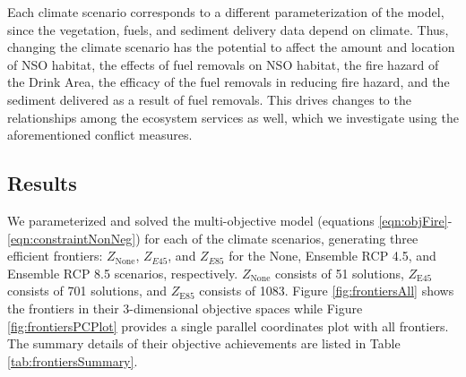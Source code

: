 Each climate scenario corresponds to a different parameterization of the model, since the vegetation, fuels, and sediment delivery data depend on climate. Thus, changing the climate scenario has the potential to affect the amount and location of NSO habitat, the effects of fuel removals on NSO habitat, the fire hazard of the Drink Area, the efficacy of the fuel removals in reducing fire hazard, and the sediment delivered as a result of fuel removals. This drives changes to the relationships among the ecosystem services as well, which we investigate using the aforementioned conflict measures.


\subsection{Results}
We parameterized and solved the multi-objective model (equations \eqref{eqn:objFire}-\eqref{eqn:constraintNonNeg}) for each of the climate scenarios, generating three efficient frontiers: $Z_{\text{None}}$, $Z_{E45}$, and $Z_{E85}$ for the None, Ensemble RCP 4.5, and Ensemble RCP 8.5 scenarios, respectively.  $Z_{\text{None}}$ consists of 51 solutions, $Z_{\text{E45}}$ consists of 701 solutions, and $Z_{\text{E85}}$ consists of 1083. Figure \ref{fig:frontiersAll} shows the frontiers in their 3-dimensional objective spaces while Figure \ref{fig:frontiersPCPlot} provides a single parallel coordinates plot with all frontiers. The summary details of their objective achievements are listed in Table \ref{tab:frontiersSummary}.

